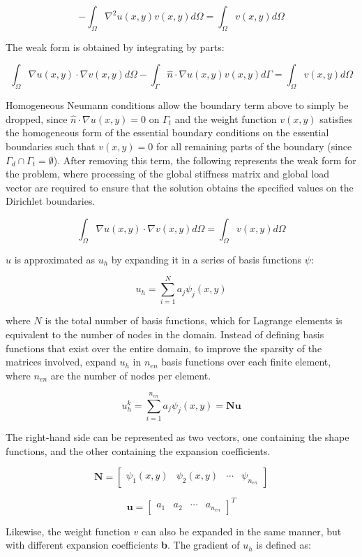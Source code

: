\documentclass[10pt]{article}
\newcommand{\beq}{\begin{equation}}
\newcommand{\eeq}{\end{equation}}
\begin{document}
\beq
-\int_\Omega \nabla^2u(x,y)v(x,y)d\Omega=\int_\Omega v(x,y)d\Omega
\eeq

The weak form is obtained by integrating by parts:

\beq
\int_\Omega \nabla u(x,y)\cdot\nabla v(x,y)d\Omega-\int_\Gamma\hat{n}\cdot\nabla u(x,y)v(x,y)d\Gamma=\int_\Omega v(x,y)d\Omega
\eeq

Homogeneous Neumann conditions allow the boundary term above to simply be dropped, since \(\hat{n}\cdot\nabla u(x,y)=0\) on \(\Gamma_t\) and the weight function \(v(x,y)\) satisfies the homogeneous form of the essential boundary conditions on the essential boundaries such that \(v(x,y)=0\) for all remaining parts of the boundary (since \(\Gamma_d\cap\Gamma_t=\emptyset\)). After removing this term, the following represents the weak form for the problem, where processing of the global stiffness matrix and global load vector are required to ensure that the solution obtains the specified values on the Dirichlet boundaries.

\beq
\int_\Omega \nabla u(x,y)\cdot\nabla v(x,y)d\Omega=\int_\Omega v(x,y)d\Omega
\eeq

\(u\) is approximated as \(u_h\) by expanding it in a series of basis functions \(\psi\):

\beq
u_h=\sum_{i=1}^{N}a_j\psi_j(x,y)
\eeq

where \(N\) is the total number of basis functions, which for Lagrange elements is equivalent to the number of nodes in the domain. Instead of defining basis functions that exist over the entire domain, to improve the sparsity of the matrices involved, expand \(u_h\) in \(n_{en}\) basis functions over each finite element, where \(n_{en}\) are the number of nodes per element. 

\beq
u_h^k=\sum_{i=1}^{n_{en}}a_j\psi_j(x,y)=\textbf{N}\textbf{u}
\eeq

The right-hand side can be represented as two vectors, one containing the shape functions, and the other containing the expansion coefficients. 

\beq
\textbf{N}=\begin{bmatrix} \psi_1(x,y) & \psi_2(x,y) & \cdots & \psi_{n_{en}}\end{bmatrix}
\eeq

\beq
\textbf{u}=\begin{bmatrix} a_1 & a_2 & \cdots & a_{n_{en}}\end{bmatrix}^T
\eeq

Likewise, the weight function \(v\) can also be expanded in the same manner, but with different expansion coefficients \textbf{b}. The gradient of \(u_h\) is defined as:
\end{document}
